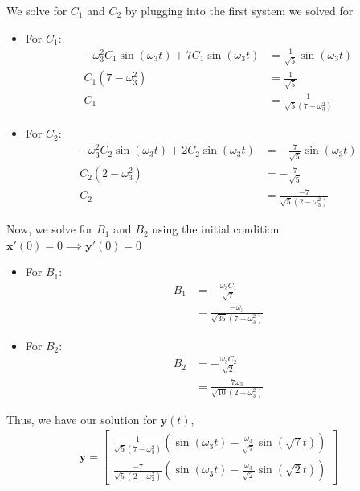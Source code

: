 \documentclass[12pt]{article}
\begin{document}
We solve for $C_1$ and $C_2$ by plugging into the first system we solved for
\begin{itemize}
    \item For $C_1$:
          \begin{align*}
              -\omega_3^2 C_1 \sin(\omega_3 t) + 7C_1 \sin(\omega_3t) & = \frac{1}{\sqrt{5}} \sin(\omega_3t) \\
              C_1(7-\omega_3^2)                                       & = \frac{1}{\sqrt{5}}                 \\
              C_1                                                     & = \frac{1}{\sqrt{5}(7-\omega_3^2)}
          \end{align*}
    \item For $C_2$:
          \begin{align*}
              -\omega_3^2 C_2 \sin(\omega_3 t) + 2C_2 \sin(\omega_3t) & = -\frac{7}{\sqrt{5}} \sin(\omega_3t) \\
              C_2(2-\omega_3^2)                                       & = -\frac{7}{\sqrt{5}}                 \\
              C_2                                                     & = \frac{-7}{\sqrt{5}(2-\omega_3^2)}
          \end{align*}
\end{itemize}

Now, we solve for $B_1$ and $B_2$ using the initial condition $\mathbf{x}'(0) = 0 \implies{} \mathbf{y}'(0) = 0$
\begin{itemize}
    \item For $B_1$:
          \begin{align*}
              B_1 & = -\frac{\omega_{3} C_1}{\sqrt{7}}            \\
                  & = \frac{-\omega_{3}}{\sqrt{35}(7-\omega_3^2)}
          \end{align*}
    \item For $B_2$:
          \begin{align*}
              B_2 & = -\frac{\omega_{3} C_2}{\sqrt{2}}            \\
                  & = \frac{7\omega_{3}}{\sqrt{10}(2-\omega_3^2)}
          \end{align*}
\end{itemize}

Thus, we have our solution for $\mathbf{y}(t)$,
\begin{align*}
    \mathbf{y} = \begin{bmatrix}
                     \frac{1}{\sqrt{5}(7-\omega_3^2)}(\sin(\omega_{3}t) - \frac{\omega_3}{\sqrt{7}}\sin(\sqrt{7}t)) \\
                     \frac{-7}{\sqrt{5}(2-\omega_3^2)}(\sin(\omega_{3}t) - \frac{\omega_3}{\sqrt{2}}\sin(\sqrt{2}t))
                 \end{bmatrix}
\end{align*}
\end{document}
